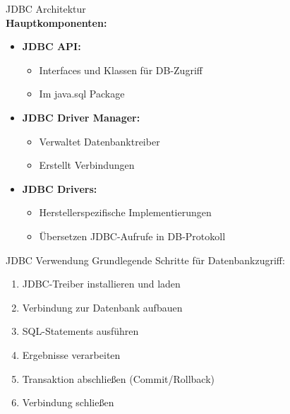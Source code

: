 \begin{concept}{JDBC Architektur}\\
\textbf{Hauptkomponenten:}
\begin{itemize}
    \item \textbf{JDBC API:} 
    \begin{itemize}
        \item Interfaces und Klassen für DB-Zugriff
        \item Im java.sql Package
    \end{itemize}
    \item \textbf{JDBC Driver Manager:}
    \begin{itemize}
        \item Verwaltet Datenbanktreiber
        \item Erstellt Verbindungen
    \end{itemize}
    \item \textbf{JDBC Drivers:}
    \begin{itemize}
        \item Herstellerspezifische Implementierungen
        \item Übersetzen JDBC-Aufrufe in DB-Protokoll
    \end{itemize}
\end{itemize}
\end{concept}

\begin{KR}{JDBC Verwendung}
Grundlegende Schritte für Datenbankzugriff:
\begin{enumerate}
    \item JDBC-Treiber installieren und laden
    \item Verbindung zur Datenbank aufbauen
    \item SQL-Statements ausführen
    \item Ergebnisse verarbeiten
    \item Transaktion abschließen (Commit/Rollback)
    \item Verbindung schließen
\end{enumerate}
\end{KR}


